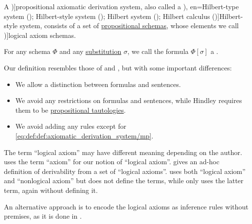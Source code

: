 \begin{definition}\label{def:axiomatic_derivation_system}\mimprovised
  A \term[en=axiomatic system (\cite[6D1]{Hindley1997})]{propositional axiomatic derivation system}, also called a \term[ru=исчисление высказываний гильбертовского типа (\cite[35]{Герасимов2011}), en=Hilbert-type system (\cite[80]{Smullyan1995}); Hilbert-style system (\cite[6D1]{Hindley1997}); Hilbert system (\cite[33]{TroelstraSchwichtenberg2000}); Hilbert calculus (\cite[103]{Mimram2020})]{Hilbert-style system}, consists of a set of \hyperref[def:propositional_formula_schema]{propositional schemas}, whose elements we call \term[en=axiom schema (\cite[80]{Smullyan1995})]{logical axiom schemas}.

  For any schema \( \Phi \) and any \hyperref[def:uniform_schema_substitution]{substitution} \( \sigma \), we call the formula \( \Phi[\sigma] \) a .
\end{definition}
\begin{comments}
  \item Our definition resembles those of  and , but with some important differences:
  \begin{itemize}
    \item We allow a distinction between formulas and sentences.
    \item We avoid any restrictions on formulas and sentences, while Hindley requires them to be \hyperref[def:propositional_tautology]{propositional tautologies}.
    \item We avoid adding any rules except for \eqref{eq:def:def:axiomatic_derivation_system/mp}.
  \end{itemize}

  \item The term \enquote{logical axiom} may have different meaning depending on the author.  uses the term \enquote{axiom} for our notion of \enquote{logical axiom}.  gives an ad-hoc definition of derivability from a set of \enquote{logical axioms}.  uses both \enquote{logical axiom} and \enquote{nonlogical axiom} but does not define the terms, while  only uses the latter term, again without defining it.

  \item An alternative approach is to encode the logical axioms as inference rules without premises, as it is done in \cite[103]{Mimram2020}.
\end{comments}

